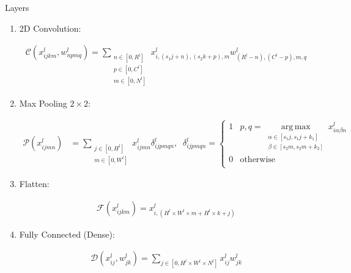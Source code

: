 \documentclass[12pt]{article} %
\begin{document}

\begin{section}{Layers}
\begin{enumerate}
\item
2D Convolution:

\begin{align}
\mathcal{C}(x^{l}_{ijkm}, w^{l}_{npmq}) = \sum\limits_{\substack{n\in [0,R^{l}]\\ p\in [0,C^{l}]\\ m\in [0,N^{l}]}}{x^{l}_{i, (s_{1}j+n),(s_{2}k+p),m} w^{l}_{(R^{l}-n),(C^{l}-p),m,q}}
\end{align}

\item
Max Pooling $2\times 2$:

\begin{align}
\mathcal{P}(x^{l}_{ijmn}) &= \sum\limits_{\substack{j\in [0,H^{l}]\\ m\in [0,W^{l}]}}{x^{l}_{ijmn} \delta^{l}_{ijpmqn}},\;\; \delta^{l}_{ijpmqn} = \left\{\begin{array}{ll} 
      1 & p, q = \mathop{\mathrm{arg\, max}}\limits_{\substack{\alpha\in [s_{1}j,s_{1}j+k_{1}]\\ \beta\in [s_{2}m,s_{2}m+k_{2}]}}{x^{l}_{i\alpha\beta n}} \\
      0 & \text{otherwise} \\
   \end{array}\right.
\end{align}

\item
Flatten:

\begin{align}
\mathcal{F}(x^{l}_{ijkm}) = x^{l}_{i,(H^{l}\times W^{l}\times m + H^{l}\times k + j)}
\end{align}

\item
Fully Connected (Dense):

\begin{align}
\mathcal{D}(x^{l}_{ij}, w^{l}_{jk}) = \sum\limits_{j\in [0,H^{l}\times W^{l}\times N^{l}]}{x^{l}_{ij} w^{l}_{jk}}
\end{align}
\end{enumerate}
\end{section}
\end{document}
